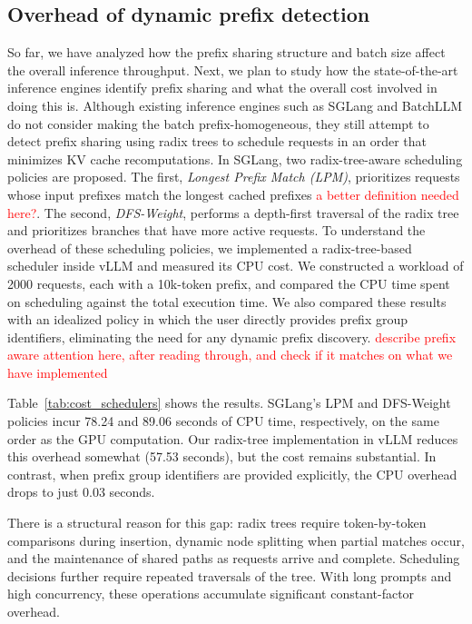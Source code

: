 \subsection{Overhead of dynamic prefix detection}
So far, we have analyzed how the prefix sharing structure and batch size affect the overall inference throughput. Next, we plan to study how the state-of-the-art inference engines identify prefix sharing and what the overall cost involved in doing this is. Although existing inference engines such as SGLang \cite{zheng2024sglangefficientexecutionstructured} and BatchLLM \cite{zheng2025batchllmoptimizinglargebatched} do not consider making the batch prefix-homogeneous, they still attempt to detect prefix sharing using radix trees to schedule requests in an order that minimizes KV cache recomputations. In SGLang, two radix-tree-aware scheduling policies are proposed. The first, \emph{Longest Prefix Match (LPM)}, prioritizes requests whose input prefixes match the longest cached prefixes \textcolor{red}{a better definition needed here?}. The second, \emph{DFS-Weight}, performs a depth-first traversal of the radix tree and prioritizes branches that have more active requests. To understand the overhead of these scheduling policies, we implemented a radix-tree-based scheduler inside vLLM and measured its CPU cost. We constructed a workload of 2000 requests, each with a 10k-token prefix, and compared the CPU time spent on scheduling against the total execution time. We also compared these results with an idealized policy in which the user directly provides prefix group identifiers, eliminating the need for any dynamic prefix discovery. \textcolor{red}{describe prefix aware attention here, after reading through, and check if it matches on what we have implemented}

Table~\ref{tab:cost_schedulers} shows the results. SGLang’s LPM and DFS-Weight policies incur 78.24 and 89.06 seconds of CPU time, respectively, on the same order as the GPU computation. Our radix-tree implementation in vLLM reduces this overhead somewhat (57.53 seconds), but the cost remains substantial. In contrast, when prefix group identifiers are provided explicitly, the CPU overhead drops to just 0.03 seconds.

There is a structural reason for this gap: radix trees require token-by-token comparisons during insertion, dynamic node splitting when partial matches occur, and the maintenance of shared paths as requests arrive and complete. Scheduling decisions further require repeated traversals of the tree. With long prompts and high concurrency, these operations accumulate significant constant-factor overhead. 


